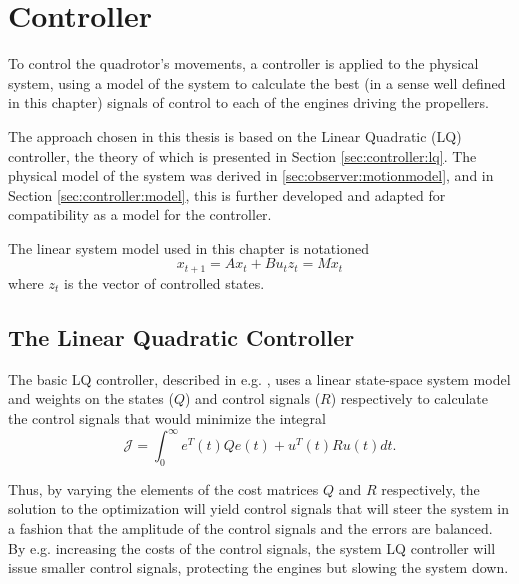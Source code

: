 \chapter{Controller}
\label{cha:controller}
    To control the quadrotor's movements, a controller is applied to the
    physical system, using a model of the system to calculate the best
    (in a sense well defined in this chapter) signals of control to each
    of the engines driving the propellers.

    The approach chosen in this thesis is based on the Linear Quadratic (LQ)
    controller, the theory of which is presented in Section \ref{sec:controller:lq}.
    The physical model of the system was derived in \ref{sec:observer:motionmodel},
    and in Section \ref{sec:controller:model}, this is further developed
    and adapted for compatibility as a model for the controller.

    The linear system model used in this chapter is notationed
    \begin{subequations}
        \begin{equation}
            x_{t+1} = Ax_{t} + Bu_{t}
        \end{equation}
        \begin{equation}
            z_{t} = Mx_{t}
        \end{equation}
    \end{subequations}
    where $z_{t}$ is the vector of controlled states.

    \section{The Linear Quadratic Controller}
        The basic LQ controller, described in e.g. \citep{glad2003reglerteori},
        uses a linear state-space system model and weights on the states ($Q$) and control
        signals ($R$) respectively to calculate the control signals that would
        minimize the integral
        \begin{equation}
        \label{eq:controller:lq:j}
            \mathcal{J} = \int_{0}^{\infty} e^{T}(t)Qe(t) + u^{T}(t)Ru(t) dt.
        \end{equation}

        Thus, by varying the elements of the cost matrices $Q$ and $R$
        respectively, the solution to the optimization will yield control
        signals that will steer the system in a fashion that the amplitude
        of the control signals and the errors are balanced.
        By e.g. increasing the costs of the control signals, the system
        LQ controller will issue smaller control signals, protecting the
        engines but slowing the system down.

